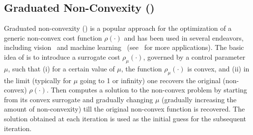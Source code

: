 

\subsection{Graduated Non-Convexity (\GNC)}
\label{sec:graduatedNonConvexity}

Graduated non-convexity (\GNC) is a popular approach for the optimization of a generic non-convex cost function $\rho(\cdot)$ and has been used in several endeavors, including vision~\cite{Blake1987book-visualReconstruction} and machine learning~\cite{Rose1998IEEE-deterministicAnnealing} (see~\cite{Mobahi2015WCVPR-continuationConvexEnvelope} for more applications).
 The basic idea of \GNC is to introduce 
 a surrogate cost $\rho_{\mu}(\cdot)$, governed by a control parameter $\mu$, such that (i) for a certain value of $\mu$, the function $\rho_{\mu}(\cdot)$ is convex, 
 and (ii) in the limit (typically for $\mu$ going to 1 or infinity) one recovers the original (non-convex) $\rho(\cdot)$. 
 Then \GNC computes a solution to the non-convex problem by starting from its convex surrogate and gradually changing $\mu$ (\ie gradually increasing the amount of non-convexity) till the original non-convex function is recovered. The solution obtained at each iteration is used as the initial guess for the subsequent iteration. 


